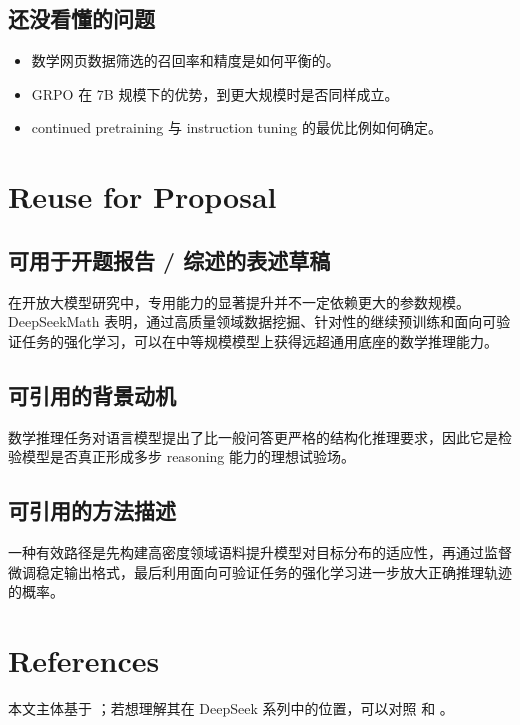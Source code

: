\documentclass[UTF8,fontset=fandol,zihao=-4]{ctexart}
\begin{document}
\subsection{还没看懂的问题}
\begin{itemize}
  \item 数学网页数据筛选的召回率和精度是如何平衡的。
  \item GRPO 在 7B 规模下的优势，到更大规模时是否同样成立。
  \item continued pretraining 与 instruction tuning 的最优比例如何确定。
\end{itemize}

\section{Reuse for Proposal}

\subsection{可用于开题报告 / 综述的表述草稿}
在开放大模型研究中，专用能力的显著提升并不一定依赖更大的参数规模。DeepSeekMath 表明，通过高质量领域数据挖掘、针对性的继续预训练和面向可验证任务的强化学习，可以在中等规模模型上获得远超通用底座的数学推理能力。

\subsection{可引用的背景动机}
数学推理任务对语言模型提出了比一般问答更严格的结构化推理要求，因此它是检验模型是否真正形成多步 reasoning 能力的理想试验场。

\subsection{可引用的方法描述}
一种有效路径是先构建高密度领域语料提升模型对目标分布的适应性，再通过监督微调稳定输出格式，最后利用面向可验证任务的强化学习进一步放大正确推理轨迹的概率。

\section{References}

本文主体基于 \cite{deepseekai2024math}；若想理解其在 DeepSeek 系列中的位置，可以对照 \cite{deepseekai2024llm} 和 \cite{deepseekai2025r1}。

\printbibliography[heading=none]
\end{document}
